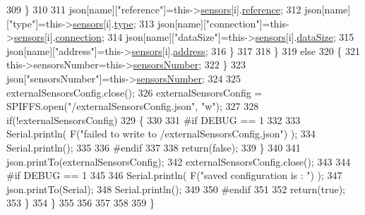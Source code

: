 \begin{DoxyCode}
309                     \}
310                                             
311                     json[name][\textcolor{stringliteral}{"reference"}]=this->\hyperlink{classExternalSensors_a284233f884fcf00154a44740cf1d9e1e}{sensors}[i].\hyperlink{structExternalSensors_1_1sensor_afed5bdfd49732202a368b600cb8396fe}{reference};
312                     json[name][\textcolor{stringliteral}{"type"}]=this->\hyperlink{classExternalSensors_a284233f884fcf00154a44740cf1d9e1e}{sensors}[i].\hyperlink{structExternalSensors_1_1sensor_a6acfdb02c742c2110d7bd2b5d9fce9e7}{type};
313                     json[name][\textcolor{stringliteral}{"connection"}]=this->\hyperlink{classExternalSensors_a284233f884fcf00154a44740cf1d9e1e}{sensors}[i].\hyperlink{structExternalSensors_1_1sensor_ae3c8c1da809f2238bc9abde37a6c6022}{connection};
314                     json[name][\textcolor{stringliteral}{"dataSize"}]=this->\hyperlink{classExternalSensors_a284233f884fcf00154a44740cf1d9e1e}{sensors}[i].\hyperlink{structExternalSensors_1_1sensor_ae9c669bb93befbe4b333920e7f357b80}{dataSize};
315                     json[name][\textcolor{stringliteral}{"address"}]=this->\hyperlink{classExternalSensors_a284233f884fcf00154a44740cf1d9e1e}{sensors}[i].\hyperlink{structExternalSensors_1_1sensor_a8d70ca58524521ed054fc6b81eb58d34}{address};
316                 \}
317  
318             \}
319             \textcolor{keywordflow}{else}
320             \{
321                 this->sensorsNumber=this->\hyperlink{classExternalSensors_a58e4fbf9adeae787d92be5fa33043b5d}{sensorsNumber};
322             \}
323             json[\textcolor{stringliteral}{"sensorsNumber"}]=this->\hyperlink{classExternalSensors_a58e4fbf9adeae787d92be5fa33043b5d}{sensorsNumber};
324 
325             externalSensorsConfig.close();
326             externalSensorsConfig = SPIFFS.open(\textcolor{stringliteral}{"/externalSensorsConfig.json"}, \textcolor{stringliteral}{"w"});
327 
328             \textcolor{keywordflow}{if}(!externalSensorsConfig)
329             \{
330             
331 \textcolor{preprocessor}{            #if DEBUG == 1 }
332 
333                 Serial.println( F(\textcolor{stringliteral}{"failed to write to /externalSensorsConfig.json"}) );
334                 Serial.println();
335             
336 \textcolor{preprocessor}{            #endif}
337 
338                 \textcolor{keywordflow}{return}(\textcolor{keyword}{false});
339             \}
340             
341             json.printTo(externalSensorsConfig);
342             externalSensorsConfig.close();
343             
344 \textcolor{preprocessor}{        #if DEBUG == 1 }
345 
346             Serial.println( F(\textcolor{stringliteral}{"saved configuration is : "}) );
347             json.printTo(Serial);
348             Serial.println();
349         
350 \textcolor{preprocessor}{        #endif}
351 
352             \textcolor{keywordflow}{return}(\textcolor{keyword}{true}); 
353         \}
354     \}   
355     
356 
357 
358 
359 \}
\end{DoxyCode}
